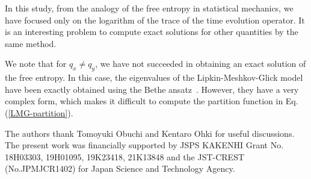 \documentclass[
aps,
pre,
showpacs
]{revtex4-1}
\begin{document}
In this study, from the analogy of the free entropy in statistical mechanics, we have focused only on the logarithm of the trace of the time evolution operator.
It is an interesting problem to compute exact solutions for other quantities by the same method.


We note that for $q_x\neq q_y$, we have not succeeded in obtaining an exact solution of the free entropy. 
In this case, the eigenvalues of the Lipkin-Meshkov-Glick model have been exactly obtained using the Bethe ansatz~\cite{PD,PD2,MOPN}.
However, they have a very complex form, which makes it difficult to compute the partition function in Eq. (\ref{LMG-partition}).

The authors thank Tomoyuki Obuchi and Kentaro Ohki for useful discussions.
The present work was financially supported by JSPS KAKENHI Grant No. 18H03303, 19H01095, 19K23418, 21K13848 and the JST-CREST (No.JPMJCR1402) for Japan Science and Technology Agency.


\appendix
\end{document}
